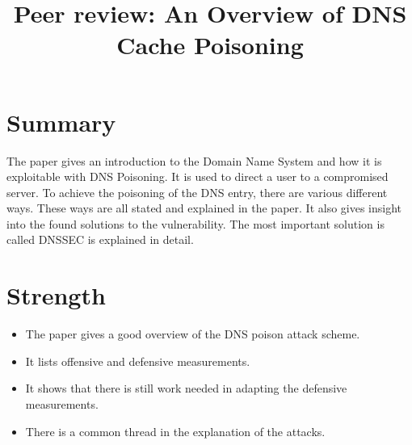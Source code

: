 \documentclass[peerreview, 10pt, onecolumn]{IEEEtran}
\begin{document}
\title{Peer review: An Overview of DNS Cache Poisoning }

\author{}

\IEEEpeerreviewmaketitle

\section*{Summary}
    The paper gives an introduction to the Domain Name System and how it is exploitable with DNS Poisoning.
    It is used to direct a user to a compromised server.
    To achieve the poisoning of the DNS entry, there are various different ways. 
    These ways are all stated and explained in the paper. 
    It also gives insight into the found solutions to the vulnerability.
    The most important solution is called DNSSEC is explained in detail.
\section*{Strength}
    \begin{itemize}
        \renewcommand\labelitemi{+}
        \item The paper gives a good overview of the DNS poison attack scheme.
        \item It lists offensive and defensive measurements.
        \item It shows that there is still work needed in adapting the defensive measurements.
        \item There is a common thread in the explanation of the attacks. 
    \end{itemize}
\end{document}
